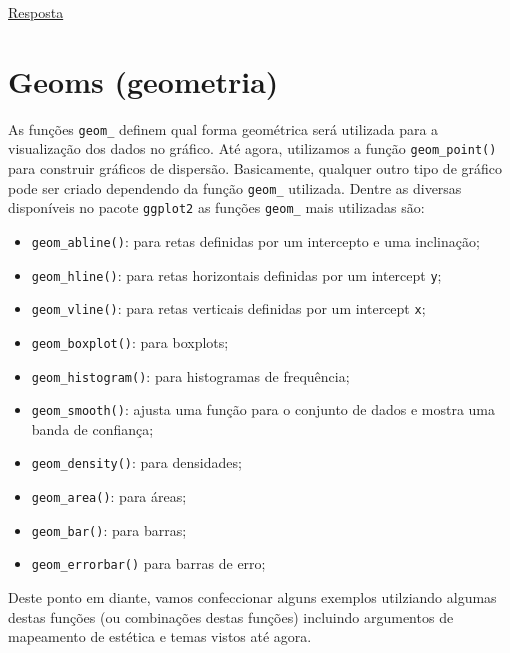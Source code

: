 \documentclass[
]{book}
\providecommand{\tightlist}{%
  \setlength{\itemsep}{0pt}\setlength{\parskip}{0pt}}
\begin{document}
\protect\hyperlink{exerc5}{Resposta}

\hypertarget{geoms-geometria}{%
\section{Geoms (geometria)}\label{geoms-geometria}}

As funções \texttt{geom\_} definem qual forma geométrica será utilizada para a visualização dos dados no gráfico. Até agora, utilizamos a função \texttt{geom\_point()}  para construir gráficos de dispersão. Basicamente, qualquer outro tipo de gráfico pode ser criado dependendo da função \texttt{geom\_} utilizada. Dentre as diversas disponíveis no pacote \texttt{ggplot2} as funções \texttt{geom\_} mais utilizadas são:

\begin{itemize}
\tightlist
\item
  \texttt{geom\_abline()}: para retas definidas por um intercepto e uma inclinação;
\item
  \texttt{geom\_hline()}: para retas horizontais definidas por um intercept \texttt{y};
\item
  \texttt{geom\_vline()}: para retas verticais definidas por um intercept \texttt{x};
\item
  \texttt{geom\_boxplot()}: para boxplots;
\item
  \texttt{geom\_histogram()}: para histogramas de frequência;
\item
  \texttt{geom\_smooth()}: ajusta uma função para o conjunto de dados e mostra uma banda de confiança;
\item
  \texttt{geom\_density()}: para densidades;
\item
  \texttt{geom\_area()}: para áreas;
\item
  \texttt{geom\_bar()}: para barras;
\item
  \texttt{geom\_errorbar()} para barras de erro;
\end{itemize}

Deste ponto em diante, vamos confeccionar alguns exemplos utilziando algumas destas funções (ou combinações destas funções) incluindo argumentos de mapeamento de estética e temas vistos até agora. 
\end{document}
